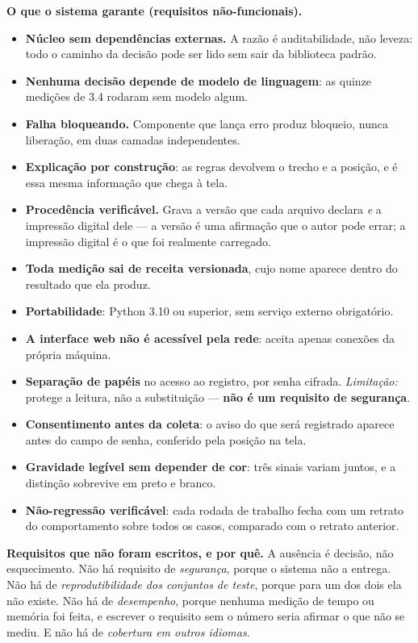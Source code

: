 \documentclass[10pt]{article}
\begin{document}
\textbf{O que o sistema garante (requisitos não-funcionais).}

\begin{itemize}\itemsep0pt
\item[\textbf{RNF1}] \textbf{Núcleo sem dependências externas.} A razão é auditabilidade, não leveza: todo o caminho da decisão pode ser lido sem sair da biblioteca padrão.
\item[\textbf{RNF2}] \textbf{Nenhuma decisão depende de modelo de linguagem}: as quinze medições de 3.4 rodaram sem modelo algum.
\item[\textbf{RNF3}] \textbf{Falha bloqueando.} Componente que lança erro produz bloqueio, nunca liberação, em duas camadas independentes.
\item[\textbf{RNF4}] \textbf{Explicação por construção}: as regras devolvem o trecho e a posição, e é essa mesma informação que chega à tela.
\item[\textbf{RNF5}] \textbf{Procedência verificável.} Grava a versão que cada arquivo declara \emph{e} a impressão digital dele --- a versão é uma afirmação que o autor pode errar; a impressão digital é o que foi realmente carregado.
\item[\textbf{RNF6}] \textbf{Toda medição sai de receita versionada}, cujo nome aparece dentro do resultado que ela produz.
\item[\textbf{RNF7}] \textbf{Portabilidade}: Python 3.10 ou superior, sem serviço externo obrigatório.
\item[\textbf{RNF8}] \textbf{A interface web não é acessível pela rede}: aceita apenas conexões da própria máquina.
\item[\textbf{RNF9}] \textbf{Separação de papéis} no acesso ao registro, por senha cifrada. \emph{Limitação:} protege a leitura, não a substituição --- \textbf{não é um requisito de segurança}.
\item[\textbf{RNF10}] \textbf{Consentimento antes da coleta}: o aviso do que será registrado aparece antes do campo de senha, conferido pela posição na tela.
\item[\textbf{RNF11}] \textbf{Gravidade legível sem depender de cor}: três sinais variam juntos, e a distinção sobrevive em preto e branco.
\item[\textbf{RNF12}] \textbf{Não-regressão verificável}: cada rodada de trabalho fecha com um retrato do comportamento sobre todos os casos, comparado com o retrato anterior.
\end{itemize}

\textbf{Requisitos que não foram escritos, e por quê.} A ausência é decisão, não esquecimento. Não há requisito de \emph{segurança}, porque o sistema não a entrega. Não há de \emph{reprodutibilidade dos conjuntos de teste}, porque para um dos dois ela não existe. Não há de \emph{desempenho}, porque nenhuma medição de tempo ou memória foi feita, e escrever o requisito sem o número seria afirmar o que não se mediu. E não há de \emph{cobertura em outros idiomas}.
\end{document}
